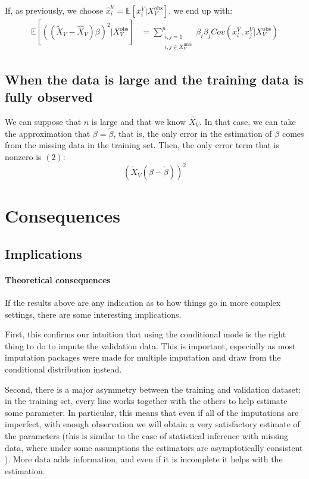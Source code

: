 \documentclass[12pt, a4paper]{memoir}
\begin{document}
 If, as previously, we choose $\hat{x}^V_i = \mathbb{E}[x^V_i \vert X_V^{\text{obs}}]$, we end up with:
 \begin{align*}
 \mathbb{E}[((\tilde{X}_V - \hat{X}_V)\beta)^2 \vert X_V^{\text{obs}}] &= 
 	\sum \limits_{\substack{i,j=1 \\i,j \in X_V^{\text{miss}}}}^{p} \beta_i \beta_j Cov(x^V_i, x^V_j \vert X_V^{\text{obs}})
 \end{align*}
 
		\subsection{When the data is large and the training data is fully observed}
We can suppose that $n$ is large and that we know $\tilde{X_V}$. In that case, we can take the approximation that $\beta = \tilde{\beta}$, that is, the only error in the estimation of $\beta$ comes from the missing data in the training set. Then, the only error term that is nonzero is $(2)$:
$$ (\tilde{X}_V (\beta - \tilde{\beta}))^2$$
	\section{Consequences}
		\subsection{Implications}
\paragraph{Theoretical consequences}
If the results above are any indication as to how things go in more complex settings, there are some interesting implications. 

First, this confirms our intuition that using the conditional mode is the right thing to do to impute the validation data. This is important, especially as most imputation packages were made for multiple imputation and draw from the conditional distribution instead.

Second, there is a major asymmetry between the training and validation dataset: in the training set, every line works together with the others to help estimate some parameter. In particular, this means that even if all of the imputations are imperfect, with enough observation we will obtain a very satisfactory estimate of the parameters (this is similar to the case of statistical inference with missing data, where under some assumptions the estimators are asymptotically consistent \cite{rubin_ignorability}). More data adds information, and even if it is incomplete it helps with the estimation.
\end{document}
